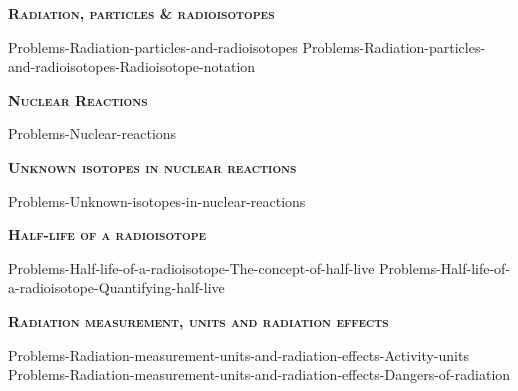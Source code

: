 \documentclass[main.tex]{subfiles}
\newcommand\chapterlabel{Ch-nuclear}
\begin{document}
\newpage
 
\fancyhfoffset[E,O]{0pt}
\setlength{\columnsep}{30pt}
\begin{conclusion}
\end{conclusion}
\begin{multicols*}{2}\setcounter{numA}{1}







{\raggedright\textsc{\textbf{Radiation, particles \& radioisotopes }}\par}

{Problems-Radiation-particles-and-radioisotopes}
{Problems-Radiation-particles-and-radioisotopes-Radioisotope-notation}







{\raggedright\textsc{\textbf{Nuclear Reactions }}\par}

{Problems-Nuclear-reactions}

  

 {\raggedright\textsc{\textbf{Unknown isotopes in nuclear reactions }}\par}



{Problems-Unknown-isotopes-in-nuclear-reactions}





{\raggedright\textsc{\textbf{Half-life of a radioisotope }}\par}
{Problems-Half-life-of-a-radioisotope-The-concept-of-half-live}
{Problems-Half-life-of-a-radioisotope-Quantifying-half-live}

 
{\raggedright\textsc{\textbf{ Radiation measurement, units and radiation effects }}\par}

{Problems-Radiation-measurement-units-and-radiation-effects-Activity-units}
{Problems-Radiation-measurement-units-and-radiation-effects-Dangers-of-radiation}






\end{multicols*}
\end{document}
